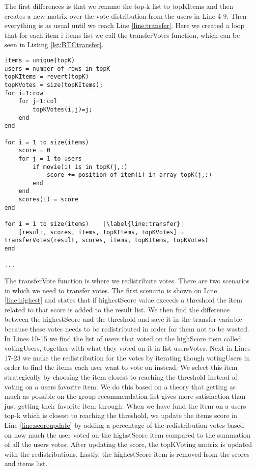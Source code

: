 The first differences is that we rename the top-k list to topKItems and then creates a new matrix over the vote distribution from the users in Line 4-9. Then everything is as usual until we reach Line \ref{line:transfer}. Here we created a loop that for each item i items list we call the transferVotes function, which can be seen in Listing \ref{lst:BTCtransfer}.


\begin{lstlisting}[caption={Borda transferable count implementation},label=lst:BTC]
items = unique(topK)
users = number of rows in topK
topKItems = revert(topK)
topKVotes = size(topKItems);
for i=1:row
    for j=1:col
        topKVotes(i,j)=j;
    end 
end

for i = 1 to size(items)
	score = 0
	for j = 1 to users
		if movie(i) is in topK(j,:)
			score += position of item(i) in array topK(j,:)
		end
	end
	scores(i) = score
end

for i = 1 to size(items)	|\label{line:transfer}|
	[result, scores, items, topKItems, topKVotes] = transferVotes(result, scores, items, topKItems, topKVotes)
end
	
...
\end{lstlisting}

The transferVote function is where we redistribute votes. There are two scenarios in which we need to transfer votes. The first scenario is shown on Line \ref{line:highest} and states that if highestScore value exceeds a threshold the item related to that score is added to the result list. We then find the difference between the highestScore and the threshold and save it in the transfer variable because these votes needs to be redistributed in order for them not to be wasted. In Lines 10-15 we find the list of users that voted on the highScore item  called votingUsers, together with what they voted on it in list usersVotes. Next in Lines 17-23 we make the redistribution for the votes by iterating though votingUsers in order to find the items each user want to vote on instead. We select this item strategically by choosing the item closest to reaching the threshold instead of voting on a users favorite item. We do this based on a theory that getting as much as possible on the group recommendation list gives more satisfaction than just getting their favorite item through. When we have fund the item on a users top-k which is closest to reaching the threshold, we update the items score in Line \ref{line:scoreupdate} by adding a percentage of the redistribution votes based on how much the user voted on the highstScore item compared to the summation of all the users votes. After updating the score, the topKVoting matrix is updated with the redistributions. Lastly, the highestScore item is removed from the scores and items list. 

